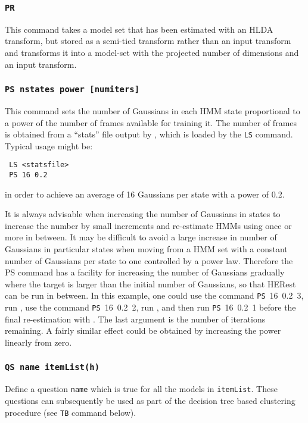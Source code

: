 \subsubsection*{\tt PR }

This command takes a model set that has been estimated with an HLDA transform,
but stored as a semi-tied transform rather than an input transform and 
transforms it into a model-set with the projected number of dimensions and
an input transform.

\subsubsection*{\tt PS nstates power [numiters]   }

This command sets the number of Gaussians in each HMM state
proportional to a power of the number of frames available for training it.  The
number of frames is obtained from a ``stats'' file output by ,
which is loaded by the \texttt{LS} command.  Typical usage might be:
\begin{verbatim}
 LS <statsfile> 
 PS 16 0.2 
\end{verbatim}
in order to achieve an average of 16 Gaussians per state with a power
of 0.2.  

It is always advisable when increasing the number of Gaussians in states to
increase the number by small increments and re-estimate HMMs using
 once or more in between.  It may be difficult to avoid a
large increase in number of Gaussians in particular states when moving from
a HMM set with a constant number of Gaussians per state to one controlled
by a power law.  Therefore the PS command has a facility for increasing
the number of Gaussians gradually where the target is larger than the
initial number of Gaussians, so that HERest can be run in between.  In this
example, one could use the  command \texttt{PS}~16~0.2~3, run
, use the command \texttt{PS}~16~0.2~2, run ,
and then run \texttt{PS}~16~0.2~1 before the final re-estimation with
.  The last argument is the number of iterations remaining.
A fairly similar effect could be obtained by increasing the power linearly
from zero.


\subsubsection*{\tt QS name itemList(h)}

Define a question \texttt{name} which is true for all the models in
\texttt{itemList}.  These questions can subsequently be used as part 
of the decision tree based clustering procedure (see \texttt{TB}
command below).

